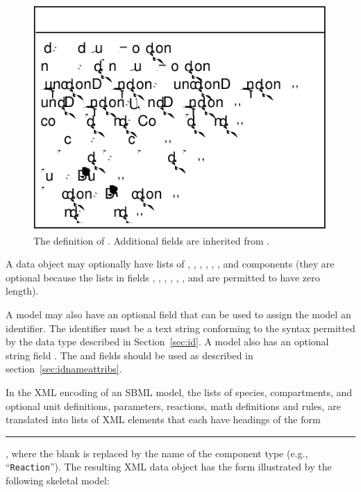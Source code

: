 \documentclass[10pt]{cekarticle}
\begin{document}
\begin{figure}[htb]
  \centering
  \includegraphics[scale = 0.68]{model}
  \caption{The definition of .  Additional fields are
    inherited from .}
  \label{fig:model}
\end{figure}

A  data object may optionally have lists of , , , , , , and  components (they are optional because the lists in fields , , , , , , and  are permitted to have zero length).

A model may also have an optional  field that can be
used to assign the model an identifier. The identifier must be a
text string conforming to the syntax permitted by the 
data type described in Section~\ref{sec:id}. A model also has an
optional string field .  The  and
 fields should be used as described in
section~\ref{sec:idnameattribs}.

In the XML encoding of an SBML model, the lists of species,
compartments, and optional unit definitions, parameters,
reactions, math definitions and rules, are translated into
lists of XML elements that each have headings of the form
\rule{0.5in}{0.5pt}, where the blank is
replaced by the name of the component type (e.g.,
``\texttt{Reaction}'').  The resulting XML data object has the
form illustrated by the following skeletal model:
\end{document}
